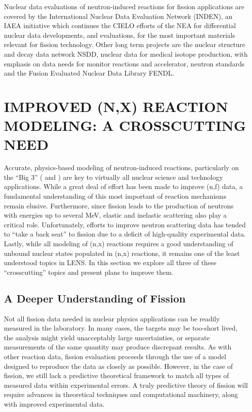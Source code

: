 \documentclass[letterpaper]{ar-1col}
\begin{document}
Nuclear data evaluations of neutron-induced reactions for fission applications are covered by the International Nuclear Data Evaluation Network (INDEN), an IAEA initiative which continues the CIELO efforts of the NEA for differential nuclear data developments, and evaluations, for the most important materials relevant for fission technology.
 Other long term projects are the nuclear structure and decay data network NSDD, nuclear data for medical isotope production, with emphasis on data needs for monitor reactions and accelerator, neutron standards and the Fusion Evaluated Nuclear Data Library FENDL.

\section{IMPROVED (N,X) REACTION MODELING: A CROSSCUTTING NEED}
 
Accurate, physics-based modeling of neutron-induced reactions, particularly on the \enquote{Big 3} ( and ) are key to virtually all nuclear science and technology applications.
 While a great deal of effort has been made to improve (n,f) data, a fundamental understanding of this most important of reaction mechanisms remain elusive.
 Furthermore, since fission leads to the production of neutrons with energies up to several MeV, elastic and inelastic scattering also play a critical role.
 Unfortunately, efforts to improve neutron scattering data has tended to \enquote{take a back seat} to fission due to a deficit of high-quality experimental data.
 Lastly, while all modeling of (n,x) reactions requires a good understanding of unbound nuclear states populated in (n,x) reactions, it remains one of the least understood topics in LENS.
 In this section we explore all three of these  \enquote{crosscutting} topics and present plans to improve them.
 

\subsection{A Deeper Understanding of Fission}

Not all fission data needed in nuclear physics applications can be readily measured in the laboratory.
In many cases, the targets may be too-short lived, the analysis might yield unacceptably large uncertainties, or separate measurements of the same quantity may produce discrepant results.
As with other reaction data, fission evaluation proceeds through the use of a model designed to reproduce the data as closely as possible.
 However, in the case of fission, we still lack a predictive theoretical framework to match all types of measured data within experimental errors.
A truly predictive theory of fission will require advances in theoretical techniques and computational machinery, along with improved experimental data.
\end{document}
